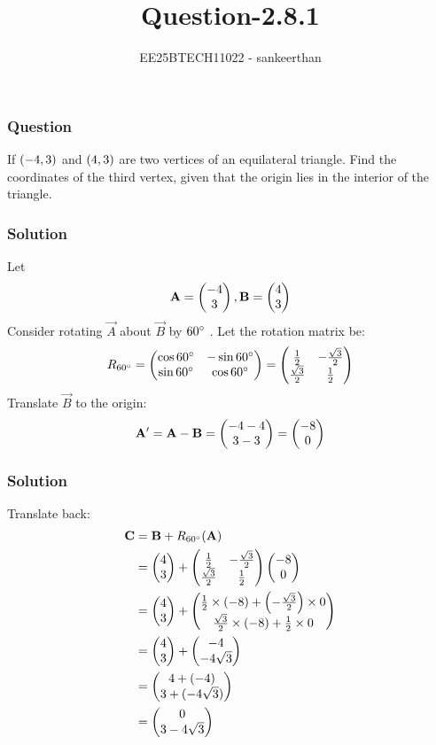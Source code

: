 \documentclass{beamer}
\title{Question-2.8.1}
\author{EE25BTECH11022 - sankeerthan}
\date{}
\begin{document}
\frame{\titlepage}

\begin{frame}
\frametitle{Question}
If $\left(-4,3\right)$ and $\left(4,3\right)$ are two vertices of an equilateral triangle. Find the coordinates of the third vertex, given that the origin lies in the interior of the triangle.
\end{frame}
\begin{frame}
\frametitle{Solution}
Let 
\begin{align}
\mathbf{A}= \begin{pmatrix}-4 \\ 3\end{pmatrix}, \mathbf{B}= \begin{pmatrix}4 \\ 3\end{pmatrix}
\end{align}
Consider rotating  $\vec{A}$  about  $\vec{B}$  by $60\degree$ .
Let the rotation matrix be:
\begin{align}
R_{60\degree} =
\begin{pmatrix}\cos 60\degree & -\sin 60\degree \\
\sin 60\degree & \cos 60\degree\end{pmatrix}=\begin{pmatrix}\frac{1}{2} & -\frac{\sqrt{3}}{2} \\
\frac{\sqrt{3}}{2} & \frac{1}{2}\end{pmatrix}
\end{align}
Translate  $\vec{B}$  to the origin:
\begin{align}
\mathbf{A'} = \mathbf{A} - \mathbf{B} = \begin{pmatrix}-4-4 \\ 3-3\end{pmatrix} = \begin{pmatrix}-8 \\ 0\end{pmatrix}
\end{align}
\end{frame}
\begin{frame}
\frametitle{Solution}
Translate back:
\begin{align}
\mathbf{C}&= \mathbf{B}+ R_{60\degree}(\mathbf{A}) \\ 
       &= \begin{pmatrix}4 \\  3\end{pmatrix} +\begin{pmatrix}\frac{1}{2} & -\frac{\sqrt{3}}{2} \\
\frac{\sqrt{3}}{2} & \frac{1}{2} \end{pmatrix}\begin{pmatrix}-8 \\ 0\end{pmatrix} \\
       &= \begin{pmatrix}4 \\3\end{pmatrix}+\begin{pmatrix}\frac{1}{2}\times(-8) + \left(-\frac{\sqrt{3}}{2}\right)\times0 \\ \frac{\sqrt{3}}{2}\times(-8) +\frac{1}{2}\times 0\end{pmatrix}\\
       &= \begin{pmatrix}4 \\3\end{pmatrix}+\begin{pmatrix}-4 \\ -4\sqrt{3}\end{pmatrix} \\
       &=\begin{pmatrix}4+(-4) \\3+(-4\sqrt{3})\end{pmatrix} \\
       &= \begin{pmatrix}0 \\ 3-4\sqrt{3}\end{pmatrix}
\end{align}
\end{frame}
\end{document}
